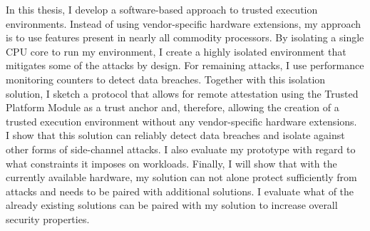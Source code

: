 In this thesis, I develop a software-based approach to trusted execution
environments. Instead of using vendor-specific hardware extensions, my approach
is to use features present in nearly all commodity processors. By isolating a
single CPU core to run my environment, I create a highly isolated environment
that mitigates some of the attacks by design. For remaining attacks, I use
performance monitoring counters to detect data breaches. Together with this
isolation solution, I sketch a protocol that allows for remote attestation using
the Trusted Platform Module as a trust anchor and, therefore, allowing the
creation of a trusted execution environment without any vendor-specific hardware
extensions.\\

I show that this solution can reliably detect data breaches and isolate against
other forms of side-channel attacks. I also evaluate my prototype with regard to
what constraints it imposes on workloads. Finally, I will show that with the
currently available hardware, my solution can not alone protect sufficiently
from attacks and needs to be paired with additional solutions. I evaluate what
of the already existing solutions can be paired with my solution to increase
overall security properties.

